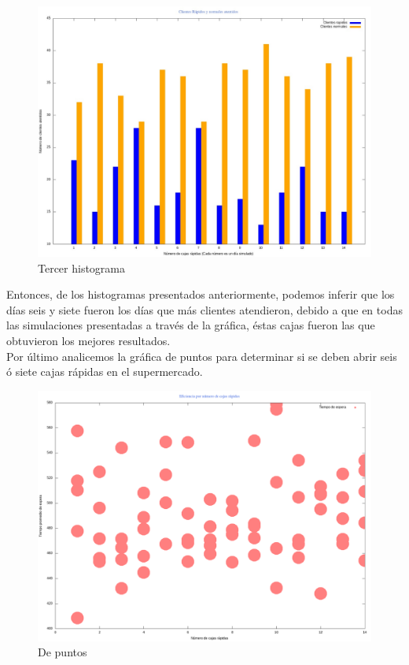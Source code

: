 \documentclass[letterpaper,11pt]{article}
\begin{document}
\begin{figure}[htb]
	\centering  
	\includegraphics[scale=.20]{Barras4.jpeg} 
	\caption{Tercer histograma} 
\end{figure}

Entonces, de los histogramas presentados anteriormente, podemos inferir que los días seis y siete fueron los días que más clientes atendieron, debido a que en todas las simulaciones presentadas a través de la gráfica, éstas cajas fueron las que obtuvieron los mejores resultados.\\Por último analicemos la gráfica de puntos para determinar si se deben abrir seis ó siete cajas rápidas en el supermercado.
\begin{figure}[htb]	
	\centering
	\includegraphics[scale=.21]{PuntosMultiple.png}
	\caption{De puntos}
\end{figure}\\
\end{document}
